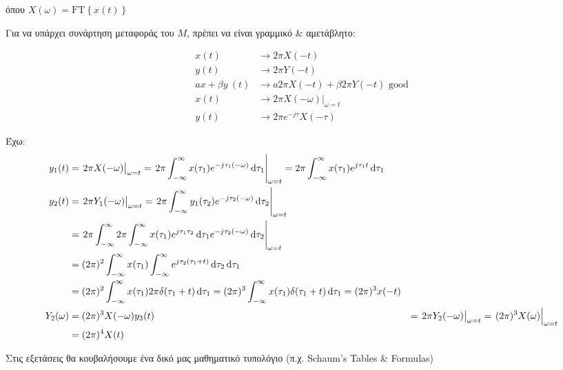 \documentclass[11pt,a4paper,titlepage,fleqn]{article}
\begin{document}
    όπου \( X(\omega ) = \mathrm{FT}\left\lbrace x(t) \right\rbrace \)
    
    Για να υπάρχει συνάρτηση μεταφοράς του \( M \), πρέπει να είναι γραμμικό \& αμετάβλητο:
    
    \begin{align*}
    	x(t) &\to 2\pi X(-t) \\
    	y(t) &\to 2\pi Y(-t) \\
    	ax+\beta y\ (t) &\to a2\pi X(-t) + \beta 2\pi Y(-t) \text{ good} \\[.3em]
    	x(t) &\to \left. 2\pi X(-\omega ) \right|_{\omega = t} \\
    	y(t) &\to 2\pi e^{-j\tau} X(-\tau)
    \end{align*}
    
    Έχω:
    \begin{align*}
    	y_1(t) &= \left. 2\pi X(-\omega )\right|_{\omega =t}
    	= \left.2\pi \int_{-\infty}^{\infty} x(\tau_1) e^{-j\tau_1(-\omega )}\dif\tau_1
    	\right|_{\omega =t}
    	=2\pi \int_{-\infty}^{\infty} x(\tau_1) e^{j\tau_1 t}\dif\tau_1 \\
    	y_2(t) &= \left. 2\pi Y_1(-\omega )\right|_{\omega =t}
    	= \left.2\pi \int_{-\infty}^{\infty} y_1(\tau_2) e^{-j\tau_2(-\omega )}\dif\tau_2
    	\right|_{\omega =t}
    	\\ &=\left. 2\pi \int_{-\infty}^{\infty} 2\pi
    	\int_{-\infty}^{\infty} x(\tau_1) e^{j\tau_1\tau_2}\dif\tau_1 e^{-j\tau_2(-\omega)}
    	\dif\tau_2\right|_{\omega = t}
    	\\ &= (2\pi)^2 \int_{-\infty}^{\infty} x(\tau_1) \int_{-\infty}^{\infty}
    	e^{j\tau_2(\tau_1+t)}\dif\tau_2\dif\tau_1
    	\\ &= (2\pi)^2 \int_{-\infty}^{\infty} x(\tau_1)2\pi \delta(\tau_1+t)\dif\tau_1
    	= (2\pi)^3 \int_{-\infty}^{\infty} x(\tau_1)\delta(\tau_1+t)\dif\tau_1 =
    	(2\pi)^3 x(-t) \\
    	Y_2(\omega) &= (2\pi)^3 X(-\omega)
    	y_3(t) &= \left. 2\pi Y_2(-\omega ) \right|_{\omega =t}
    	= \left. (2\pi)^3 X(\omega ) \right|_{\omega = t} \\ &= (2\pi)^4 X(t)
    \end{align*}
    
    \begin{attnbox}{}
    	Στις εξετάσεις θα κουβαλήσουμε ένα δικό μας μαθηματικό τυπολόγιο
    	(π.χ. Schaum's Tables \& Formulas)
    \end{attnbox}
    
\end{document}
